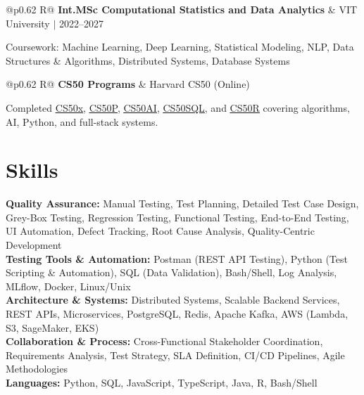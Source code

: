 \documentclass[a4paper,10pt]{article}
\newcommand{\ulink}[2]{\href{#1}{\uline{#2}}}
\newcommand{\subheading}[1]{{\color[HTML]{0A0A0A}\fontsize{12}{14}\selectfont\bfseries #1}}
\newcommand{\meta}[1]{{\color[HTML]{5C5C5C}\fontsize{10.5}{12.5}\selectfont #1}}
\begin{document}
\begin{tabularx}{\linewidth}{@{}p{0.62\linewidth} R@{}}
\subheading{Int.MSc Computational Statistics and Data Analytics} & \meta{VIT University $|$ 2022--2027}
\end{tabularx}
\vspace{1pt}
{\color[HTML]{3A3A3A}\fontsize{11}{14}\selectfont Coursework: Machine Learning, Deep Learning, Statistical Modeling, NLP, Data Structures \& Algorithms, Distributed Systems, Database Systems}

\begin{tabularx}{\linewidth}{@{}p{0.62\linewidth} R@{}}
\subheading{CS50 Programs} & \meta{Harvard CS50 (Online)}
\end{tabularx}
\vspace{1pt}
{\color[HTML]{3A3A3A}\fontsize{11}{14}\selectfont Completed \ulink{https://cs50.harvard.edu/certificates/b14b78df-e05c-413e-a607-1dd27303053a}{CS50x}, \ulink{https://cs50.harvard.edu/certificates/32477052-9db4-49c4-a5a4-d7e58429ca2c}{CS50P}, \ulink{https://cs50.harvard.edu/certificates/9cdb4d4a-1250-4f8e-9fd7-191864e0f919}{CS50AI}, \ulink{https://cs50.harvard.edu/certificates/bc486f24-f085-4e61-8536-80940b97a1b9}{CS50SQL}, and \ulink{https://cs50.harvard.edu/certificates/666838e6-a053-4d82-b179-a60fe745fd84}{CS50R} covering algorithms, AI, Python, and full-stack systems.}

\vspace{2pt}

\section{Skills}
\vspace{5pt}
{\color[HTML]{0A0A0A}\fontsize{11}{14}\selectfont
\textbf{Quality Assurance:} Manual Testing, Test Planning, Detailed Test Case Design, Grey-Box Testing, Regression Testing, Functional Testing, End-to-End Testing, UI Automation, Defect Tracking, Root Cause Analysis, Quality-Centric Development \\[2pt]
\textbf{Testing Tools \& Automation:} Postman (REST API Testing), Python (Test Scripting \& Automation), SQL (Data Validation), Bash/Shell, Log Analysis, MLflow, Docker, Linux/Unix \\[2pt]
\textbf{Architecture \& Systems:} Distributed Systems, Scalable Backend Services, REST APIs, Microservices, PostgreSQL, Redis, Apache Kafka, AWS (Lambda, S3, SageMaker, EKS) \\[2pt]
\textbf{Collaboration \& Process:} Cross-Functional Stakeholder Coordination, Requirements Analysis, Test Strategy, SLA Definition, CI/CD Pipelines, Agile Methodologies \\[2pt]
\textbf{Languages:} Python, SQL, JavaScript, TypeScript, Java, R, Bash/Shell}
\end{document}
